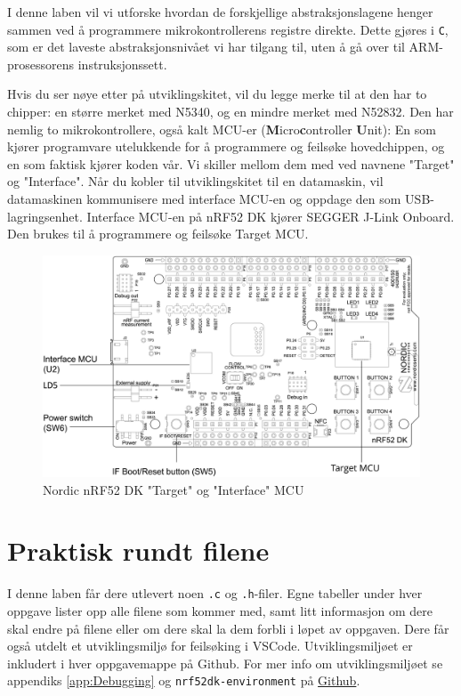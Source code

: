 \begin{alphasection}
I denne laben vil vi utforske hvordan de forskjellige abstraksjonslagene henger sammen ved å programmere mikrokontrollerens registre direkte. Dette gjøres i \verb|C|, som er det laveste abstraksjonsnivået vi har tilgang til, uten å gå over til ARM-prosessorens instruksjonssett.

Hvis du ser nøye etter på utviklingskitet, vil du legge merke til at den har to chipper: en større merket med N5340, og en mindre merket med N52832. Den har nemlig to mikrokontrollere, også kalt {MCU}-er (\textbf{M}icro\textbf{c}ontroller \textbf{U}nit): En som kjører programvare utelukkende for å programmere og feilsøke hovedchippen, og en som faktisk kjører koden vår. Vi skiller mellom dem med ved navnene "Target" og "Interface". Når du kobler til utviklingskitet til en datamaskin, vil datamaskinen kommunisere med interface MCU-en og oppdage den som USB-lagringsenhet. Interface MCU-en på nRF52 DK kjører SEGGER J-Link Onboard. Den brukes til å programmere og feilsøke Target MCU.


\begin{figure}[H]
    \centering
    \includegraphics[width=.8\linewidth]{Main/figures/pca10040_interface_mcu.png}
    \caption{Nordic nRF52 DK "Target" og "Interface" MCU}
    \label{fig:interface-mcu}
\end{figure}

\section{Praktisk rundt filene}

I denne laben får dere utlevert noen \verb|.c| og \verb|.h|-filer. Egne tabeller under hver oppgave lister opp alle filene som kommer med, samt litt informasjon om dere skal endre på filene eller om dere skal la dem forbli i løpet av oppgaven. Dere får også utdelt et utviklingsmiljø for feilsøking i VSCode. Utviklingsmiljøet er inkludert i hver oppgavemappe på Github. For mer info om utviklingsmiljøet se appendiks \ref{app:Debugging} og \verb|nrf52dk-environment| på \href{https://github.com/ITK-TTK4235/nrf52dk-environment}{Github}. 



\end{alphasection}
